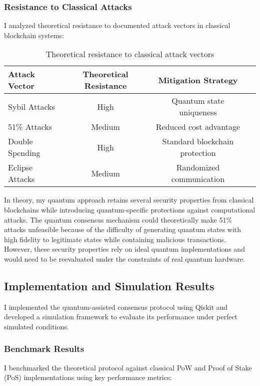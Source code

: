 \documentclass[11pt,a4paper]{article}
\begin{document}
\subsubsection{Resistance to Classical Attacks}
I analyzed theoretical resistance to documented attack vectors in classical blockchain systems:

\begin{table}[H]
\centering
\begin{tabular}{lccc}
\toprule
\textbf{Attack Vector} & \textbf{Theoretical Resistance} & \textbf{Mitigation Strategy} \\
\midrule
Sybil Attacks & High & Quantum state uniqueness \\
51\% Attacks & Medium & Reduced cost advantage \\
Double Spending & High & Standard blockchain protection \\
Eclipse Attacks & Medium & Randomized communication \\
\bottomrule
\end{tabular}
\caption{Theoretical resistance to classical attack vectors}
\label{tab:classical_security}
\end{table}

In theory, my quantum approach retains several security properties from classical blockchains while introducing quantum-specific protections against computational attacks. The quantum consensus mechanism could theoretically make 51\% attacks unfeasible because of the difficulty of generating quantum states with high fidelity to legitimate states while containing malicious transactions. However, these security properties rely on ideal quantum implementations and would need to be reevaluated under the constraints of real quantum hardware.

\subsection{Implementation and Simulation Results}
I implemented the quantum-assisted consensus protocol using Qiskit and developed a simulation framework to evaluate its performance under perfect simulated conditions.


\subsubsection{Benchmark Results}
I benchmarked the theoretical protocol against classical PoW and Proof of Stake (PoS) implementations using key performance metrics:
\end{document}
